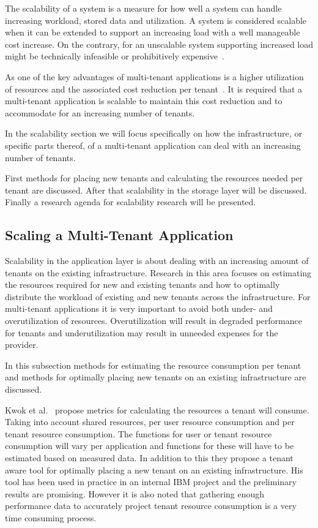 The scalability of a system is a measure for how well a system can handle increasing workload, stored data and utilization.
A system is considered scalable when it can be extended to support an increasing load with a well manageable cost increase.
On the contrary, for an unscalable system supporting increased load might be technically infeasible or prohibitively expensive~\cite{bondi2000scalability}.

As one of the key advantages of multi-tenant applications is a higher utilization of resources and the associated cost reduction per tenant~\cite{bezemer2010multi}.
It is required that a multi-tenant application is scalable to maintain this cost reduction and to accommodate for an increasing number of tenants.

In the scalability section we will focus specifically on how the infrastructure, or specific parts thereof, of a multi-tenant application can deal with an increasing number of tenants.

First methods for placing new tenants and calculating the resources needed per tenant are discussed. After that scalability in the  storage layer will be discussed. Finally a research agenda for scalability research will be presented.

\subsection{Scaling a Multi-Tenant Application}
\label{sec:scal_mta}
Scalability in the application layer is about dealing with an increasing amount of tenants on the existing infrastructure.
Research in this area focuses on estimating the resources required for new and existing tenants and how to optimally distribute the workload of existing and new tenants across the infrastructure. 
For multi-tenant applications it is very important to avoid both under- and overutilization of resources.
Overutilization will result in degraded performance for tenants and underutilization may result in unneeded expenses for the provider.

In this subsection methods for estimating the resource consumption per tenant and methods for optimally placing new tenants on an existing infrastructure are discussed.

Kwok et al.~\cite{kwok2008resource} propose metrics for calculating the resources a tenant will consume.
Taking into account shared resources, per user resource consumption and per tenant resource consumption.
The functions for user or tenant resource consumption will vary per application and functions for these will have to be estimated based on measured data.
In addition to this they propose a tenant aware tool for optimally placing a new tenant on an existing infrastructure.
His tool has been used in practice in an internal IBM project and the preliminary results are promising. 
However it is also noted that gathering enough performance data to accurately project tenant resource consumption is a very time consuming process.

